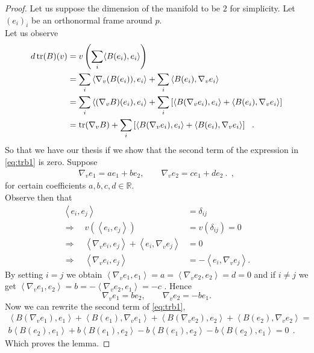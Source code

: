 \documentclass[a4paper,11pt,openright,twoside]{book}
\newcommand{\R}{\mathbb{R}}
\newcommand{\then}{\Rightarrow}
\newcommand{\tr}{\operatorname{tr}}
\newcommand{\1}{\mathds{1}}
\theoremstyle{plain}
\theoremstyle{definition}
\theoremstyle{remark}
\begin{document}
\begin{proof}
	Let us suppose  the dimension of the manifold to be $2$ for simplicity. Let $(e_i)_i$ be an orthonormal frame around $p$.\\
	Let us observe
	\begin{align}\label{eq:trb1}
	d\tr(B)(v)
	&= v\left(\sum_i \langle B(e_i),e_i\rangle\right)\notag\\
	&= \sum_i \left\langle \nabla_v(B(e_i)),e_i\right\rangle
	   + \sum_i \left\langle B(e_i),\nabla_v e_i\right\rangle\notag\\
	&= \sum_i \left\langle (\nabla_vB)(e_i),e_i\right\rangle
	   + \sum_i \left[\left\langle B(\nabla_v e_i),e_i\right\rangle
   +  \left\langle B(e_i),\nabla_v e_i\right\rangle\right]\notag\\
	&= \tr(\nabla_v B )
	   + \sum_i \left[\left\langle B(\nabla_v e_i),e_i\right\rangle
	   +  \left\langle B(e_i),\nabla_v e_i\right\rangle\right]
	\ \ .
	\end{align}
	So that we have our thesis if we show that the second term of the expression in \eqref{eq:trb1} is zero.
	Suppose  
	\begin{align*}
		\nabla_v e_1 = ae_1 + be_2,\qquad \nabla_v e_2 = ce_1+de_2\ .
	\ \ , 
	\end{align*}
	for certain coefficients $a,b,c,d\in \R$.\\
	Observe then that 
	\begin{align*}
	\left<e_i,e_j\right> &= \delta_{ij}\\
	\then\quad v\left(\left<e_i,e_j\right>\right) &= v(\delta_{ij}) = 0\\
	\then\quad \left<\nabla_v e_i,e_j\right> + \left<e_i,\nabla_v e_j\right> &= 0\\
	\then\quad \left<\nabla_v e_i,e_j\right> &= -\left<e_i,\nabla_v e_j\right>.
	\end{align*}
	By setting $i=j$ we obtain  $\left<\nabla_v e_1,e_1 \right> =a= \left<\nabla_v e_2,e_2 \right> = d = 0$ and if $i\neq j$ we get $\left<\nabla_v e_1,e_2 \right> = b = -\left<\nabla_v e_2 ,e_1\right> = -c$ . Hence
	\[\nabla_v e_1 = be_2,\qquad \nabla_v e_2 = -be_1.\]
	Now we can rewrite the second term of  \eqref{eq:trb1},
	\begin{align*}
	   \left\langle B(\nabla_v e_1),e_1\right\rangle
	   +  \left\langle B(e_1),\nabla_v e_1\right\rangle
	   + \left\langle B(\nabla_v e_2),e_2\right\rangle
	   +  \left\langle B(e_2),\nabla_v e_2\right\rangle = \\
	   b\left\langle B(e_2),e_1\right\rangle
	   +  b\left\langle B(e_1),e_2\right\rangle
	   - b\left\langle B(e_1),e_2\right\rangle
	   - b\left\langle B(e_2),e_1\right\rangle = 0
	\ \ . 
	\end{align*}
	Which proves the lemma.
\end{proof}
\end{document}
